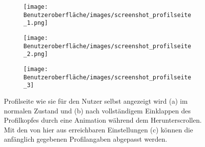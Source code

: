 \begin{figure}[tbt]
	\begin{subfigure}{0.33\textwidth}
	\centering
	\texttt{[image: Benutzeroberfläche/images/screenshot\_profilseite\_1.png]}
	\caption{}
	\label{fig:profilseite_a}
	\end{subfigure}
	\begin{subfigure}{0.33\textwidth}
	\centering
	\texttt{[image: Benutzeroberfläche/images/screenshot\_profilseite\_2.png]}
	\caption{}
	\label{fig:profilseite_b}
	\end{subfigure}
	\begin{subfigure}{0.33\textwidth}
	\centering
	\texttt{[image: Benutzeroberfläche/images/screenshot\_profilseite\_3]}
	\caption{}
	\label{fig:profilseite_c}
	\end{subfigure}
\caption{Profilseite wie sie für den Nutzer selbst angezeigt wird (a) im normalen Zustand und (b) nach vollständigem Einklappen des Profilkopfes durch eine Animation während dem Herunterscrollen. Mit den von hier aus erreichbaren Einstellungen (c) können die anfänglich gegebenen Profilangaben abgepasst werden.}
\label{fig:profilseite_alle}
\end{figure}
